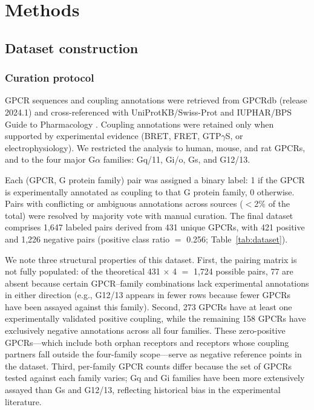 \documentclass[11pt,a4paper]{article}
\begin{document}
\section{Methods}

\subsection{Dataset construction}

\subsubsection{Curation protocol}

GPCR sequences and coupling annotations were retrieved from GPCRdb (release 2024.1) \cite{kooistra2021gpcrdb, pandy2023gpcrdb} and cross-referenced with UniProtKB/Swiss-Prot \cite{uniprot2023uniprot} and IUPHAR/BPS Guide to Pharmacology \cite{harding2024iuphar}. Coupling annotations were retained only when supported by experimental evidence (BRET, FRET, GTP$\gamma$S, or electrophysiology). We restricted the analysis to human, mouse, and rat GPCRs, and to the four major G$\alpha$ families: Gq/11, Gi/o, Gs, and G12/13.

Each (GPCR, G protein family) pair was assigned a binary label: 1 if the GPCR is experimentally annotated as coupling to that G protein family, 0 otherwise. Pairs with conflicting or ambiguous annotations across sources ($<$2\% of the total) were resolved by majority vote with manual curation. The final dataset comprises 1,647 labeled pairs derived from 431 unique GPCRs, with 421 positive and 1,226 negative pairs (positive class ratio $=$ 0.256; Table~\ref{tab:dataset}).

We note three structural properties of this dataset. First, the pairing matrix is not fully populated: of the theoretical 431 $\times$ 4 $=$ 1,724 possible pairs, 77 are absent because certain GPCR--family combinations lack experimental annotations in either direction (e.g., G12/13 appears in fewer rows because fewer GPCRs have been assayed against this family). Second, 273 GPCRs have at least one experimentally validated positive coupling, while the remaining 158 GPCRs have exclusively negative annotations across all four families. These zero-positive GPCRs---which include both orphan receptors and receptors whose coupling partners fall outside the four-family scope---serve as negative reference points in the dataset. Third, per-family GPCR counts differ because the set of GPCRs tested against each family varies; Gq and Gi families have been more extensively assayed than Gs and G12/13, reflecting historical bias in the experimental literature.
\end{document}
